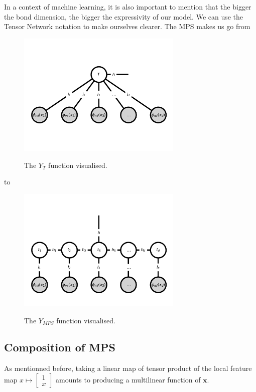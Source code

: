 \documentclass{article}
\theoremstyle{definition}
\theoremstyle{definition}
\begin{document}
In a context of machine learning, it is also important to mention that the bigger the bond dimension, the bigger the expressivity of our model. We can use the Tensor Network notation to make ourselves clearer. 
The MPS makes us go from 
\begin{figure}[hbt!]
    \centering
    \caption{The $Y_T$ function visualised.}
    \includegraphics[width=0.7\textwidth]{images/2023-04-20-11-02-45.png}
    \label{fig:full_tensor_model}
\end{figure}
to 
\begin{figure}[hbt!]
    \centering
    \caption{The $Y_{MPS}$ function visualised.}
    \includegraphics[width=0.7\textwidth]{images/2023-04-20-12-41-57.png}
    \label{fig:mps_tensor_model}
\end{figure}

\subsection{Composition of MPS}
As mentionned before, taking a linear map of  tensor product of the local feature map 
$ x \mapsto \begin{bmatrix} 1 \\ x \end{bmatrix} $ amounts to producing a multilinear function of $\mathbf{x}$.
\end{document}
